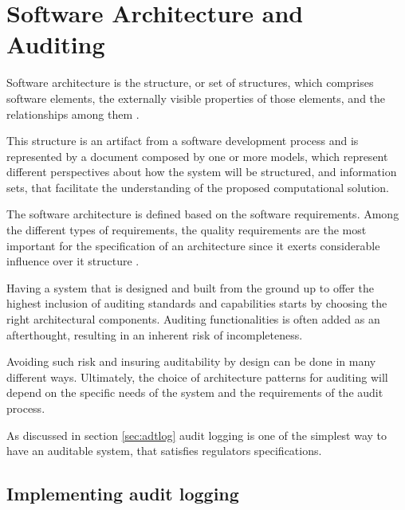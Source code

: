 %
\chapter{Software Architecture and Auditing}\label{chap:sadt}

Software architecture is the structure, or set of structures, which comprises software elements, the externally visible properties of those elements, and the relationships among them \citep{SAIP}. 

This structure is an artifact from a software development process and is represented by a document composed by one or more models, which represent different perspectives about how the system will be structured, and information sets, that facilitate the understanding of the proposed computational solution. 

The software architecture is defined based on the software requirements. Among the different types of requirements, the quality requirements are the most important for the specification of an architecture since it exerts considerable influence over it structure \citep{SAIP}.

Having a system that is designed and built from the ground up to offer the highest inclusion of auditing standards and capabilities starts by choosing the right architectural components. Auditing functionalities is often added as an afterthought, resulting in an inherent risk of incompleteness. 

Avoiding such risk and insuring auditability by design can be done in many different ways. Ultimately, the choice of architecture patterns for auditing will depend on the specific needs of the system and the requirements of the audit process.

As discussed in section \ref{sec:adtlog} audit logging is one of the simplest way to have an auditable system, that satisfies regulators specifications.



\pagebreak

\section{Implementing audit logging}\label{sec:adtimpl}

